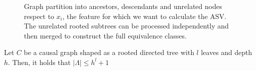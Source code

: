 \documentclass{llncs}
\begin{document}
\begin{figure}[H]
	\caption{Graph partition into ancestors, descendants and unrelated nodes respect to $x_i$, the feature for which we want to calculate the ASV. The unrelated rooted subtrees can be processed independently and then merged to construct the full equivalence classes.}
	\label{fig:ASV_forest_example}
\end{figure}

\begin{proposition}\label{prop:bound}
	Let $C$ be a causal graph shaped as a rooted directed tree with $l$ leaves and depth $h$. Then, it holds that $|\Lambda|\leq h^l + 1$	
\end{proposition}
\end{document}
